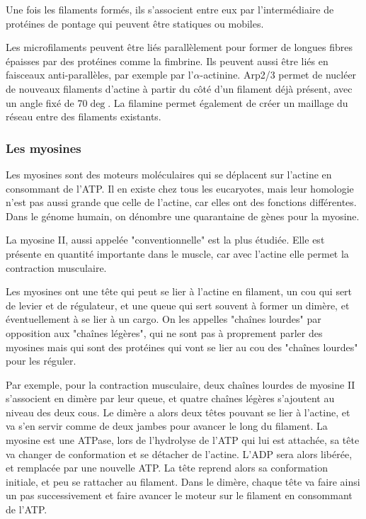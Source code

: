 Une fois les filaments formés, ils s'associent entre eux par l'intermédiaire de protéines de pontage qui peuvent être statiques ou mobiles. 

Les microfilaments peuvent être liés parallèlement pour former de longues fibres épaisses par des protéines comme la fimbrine. Ils peuvent aussi être liés en faisceaux anti-parallèles, par exemple par l'$\alpha$-actinine. 
Arp2/3 permet de nucléer de nouveaux filaments d'actine à partir du côté d'un filament déjà présent, avec un angle fixé de 70$\deg$. La filamine permet également de créer un maillage du réseau entre des filaments existants. 

\subsubsection{Les myosines}

Les myosines sont des moteurs moléculaires qui se déplacent sur l'actine en consommant de l'ATP. Il en existe chez tous les eucaryotes, mais leur homologie n'est pas aussi grande que celle de l'actine, car elles ont des fonctions différentes. Dans le génome humain, on dénombre une quarantaine de gènes pour la myosine. 

La myosine II, aussi appelée "conventionnelle" est la plus étudiée. Elle est présente en quantité importante dans le muscle, car avec l'actine elle permet la contraction musculaire. 

Les myosines ont une tête qui peut se lier à l'actine en filament, un cou  qui sert de levier et de régulateur, et une queue qui sert souvent à former un dimère, et éventuellement à se lier à un cargo. On les appelles "chaînes lourdes" par opposition aux "chaînes légères", qui ne sont pas à proprement parler des myosines mais qui sont des protéines qui vont se lier au cou des "chaînes lourdes" pour les réguler. 

Par exemple, pour la contraction musculaire, deux chaînes lourdes de myosine II s'associent en dimère par leur queue, et quatre chaînes légères s'ajoutent au niveau des deux cous. Le dimère a alors deux têtes pouvant se lier à l'actine, et va s'en servir comme de deux jambes pour avancer le long du filament. 
La myosine est une ATPase, lors de l'hydrolyse de l'ATP qui lui est attachée, sa tête va changer de conformation et se détacher de l'actine. L'ADP sera alors libérée, et remplacée par une nouvelle ATP.  La tête reprend alors sa conformation initiale, et peu se rattacher au filament. Dans le dimère, chaque tête va faire ainsi un pas successivement et faire avancer le moteur sur le filament en consommant de l'ATP. 



